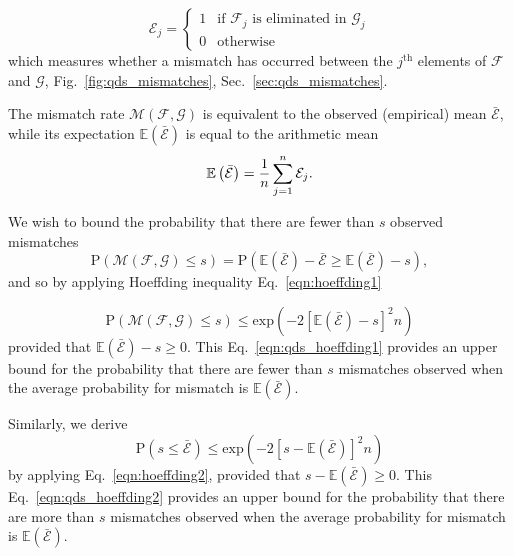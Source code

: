 \begin{equation*}\label{eqn:error}
\mathcal{E}_j = 
\begin{cases}
1 & \text{if $\mathcal{F}_j$ is eliminated in $\mathcal{G}_j$} \\
0 & \text{otherwise}
\end{cases}
\end{equation*}
which measures whether a mismatch has occurred between the $j^\text{th}$ elements of $\mathcal{F}$ and $\mathcal{G}$, Fig.~\ref{fig:qds_mismatches}, Sec.~\ref{sec:qds_mismatches}.


The mismatch rate $\mathcal{M}\left(\mathcal{F}, \mathcal{G}\right)$ is equivalent to the observed (empirical) mean $\bar{\mathcal{E}}$, while its expectation $\mathbb{E}\left(\bar{\mathcal{E}}\right)$ is equal to the arithmetic mean
\begin{equation}
\mathbb{E}\left(\bar{\mathcal{E}}\right) = \frac{1}{n} \sum_{j=1}^n \mathcal{E}_j. \notag
\end{equation}

\noindent We wish to bound the probability that there are fewer than $s$ observed mismatches
\begin{equation}
\text{P}\left(\mathcal{M}\left(\mathcal{F}, \mathcal{G}\right) \le s\right) = \text{P}\left( \mathbb{E}\left(\bar{\mathcal{E}}\right) - \bar{\mathcal{E}} \ge \mathbb{E}\left(\bar{\mathcal{E}}\right) - s\right),
\end{equation}
and so by applying Hoeffding inequality Eq.~\ref{eqn:hoeffding1}

\begin{equation}\label{eqn:qds_hoeffding1}
\text{P}\left(\mathcal{M}\left(\mathcal{F}, \mathcal{G}\right) \le s \right) \le \text{exp}\left(- 2 \left[\mathbb{E}\left(\bar{\mathcal{E}}\right) - s\right]^2 n \right)
\end{equation}
provided that $\mathbb{E}\left(\bar{\mathcal{E}}\right) - s \ge 0$. This Eq.~\ref{eqn:qds_hoeffding1} provides an upper bound for the probability that there are fewer than $s$ mismatches observed when the average probability for mismatch is $\mathbb{E}\left(\bar{\mathcal{E}}\right)$.

Similarly, we derive
\begin{equation}\label{eqn:qds_hoeffding2}
\text{P}\left(s \le \bar{\mathcal{E}}\right) \le \text{exp}\left( - 2 \left[s - \mathbb{E}\left(\bar{\mathcal{E}}\right)\right]^2 n\right)
\end{equation}
by applying Eq.~\ref{eqn:hoeffding2}, provided that $s - \mathbb{E}\left(\bar{\mathcal{E}}\right) \ge 0$. This Eq.~\ref{eqn:qds_hoeffding2} provides an upper bound for the probability that there are more than $s$ mismatches observed when the average probability for mismatch is $\mathbb{E}\left(\bar{\mathcal{E}}\right)$. 


